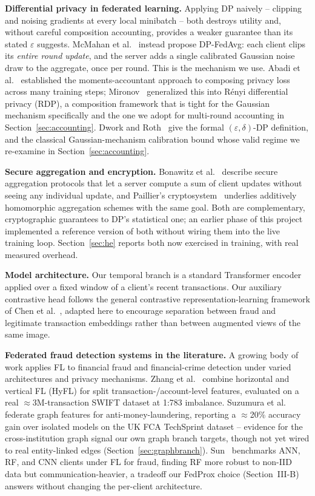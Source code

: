 \documentclass[12pt]{svproc}
\begin{document}
\textbf{Differential privacy in federated learning.} Applying DP
naively -- clipping and noising gradients at every local minibatch --
both destroys utility and, without careful composition accounting,
provides a weaker guarantee than its stated $\varepsilon$ suggests.
McMahan et al.~\cite{mcmahan2018dp} instead propose DP-FedAvg: each
client clips its \emph{entire round update}, and the server adds a
single calibrated Gaussian noise draw to the aggregate, once per round.
This is the mechanism we use. Abadi et al.~\cite{abadi2016dpsgd}
established the moments-accountant approach to composing privacy loss
across many training steps; Mironov~\cite{mironov2017rdp} generalized
this into R\'enyi differential privacy (RDP), a composition framework
that is tight for the Gaussian mechanism specifically and the one we
adopt for multi-round accounting in Section~\ref{sec:accounting}. Dwork
and Roth~\cite{dwork2014dp} give the formal $(\varepsilon,\delta)$-DP
definition, and the classical Gaussian-mechanism calibration bound whose
valid regime we re-examine in Section~\ref{sec:accounting}.

\textbf{Secure aggregation and encryption.} Bonawitz et
al.~\cite{bonawitz2017secagg} describe secure aggregation protocols that
let a server compute a sum of client updates without seeing any
individual update, and Paillier's cryptosystem~\cite{paillier1999}
underlies additively homomorphic aggregation schemes with the same
goal. Both are complementary, cryptographic guarantees to DP's
statistical one; an earlier phase of this project implemented a
reference version of both without wiring them into the live training
loop. Section~\ref{sec:he} reports both now exercised in training, with
real measured overhead.

\textbf{Model architecture.} Our temporal branch is a standard
Transformer encoder~\cite{vaswani2017attention} applied over a fixed
window of a client's recent transactions. Our auxiliary contrastive
head follows the general contrastive representation-learning framework
of Chen et al.~\cite{chen2020simclr}, adapted here to encourage
separation between fraud and legitimate transaction embeddings rather
than between augmented views of the same image.

\textbf{Federated fraud detection systems in the literature.} A growing
body of work applies FL to financial fraud and financial-crime
detection under varied architectures and privacy mechanisms. Zhang et
al.~\cite{zhang2023hyfl} combine horizontal and vertical FL (HyFL) for
split transaction-/account-level features, evaluated on a real
$\approx$3M-transaction SWIFT dataset at 1:783 imbalance. Suzumura et
al.~\cite{suzumura2019fedgraph} federate graph features for
anti-money-laundering, reporting a $\approx$20\% accuracy gain over
isolated models on the UK FCA TechSprint dataset -- evidence for the
cross-institution graph signal our own graph branch targets, though not
yet wired to real entity-linked edges (Section~\ref{sec:graphbranch}).
Sun~\cite{sun2025fedsurvey} benchmarks ANN, RF, and CNN clients under
FL for fraud, finding RF more robust to non-IID data but
communication-heavier, a tradeoff our FedProx choice (Section~III-B)
answers without changing the per-client architecture.
\end{document}
